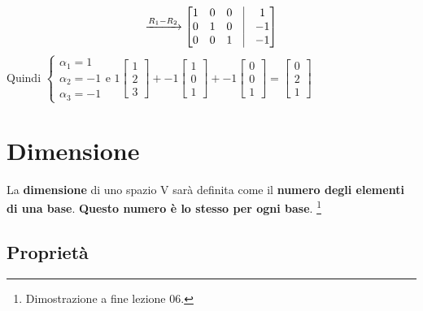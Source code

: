 \documentclass[a4paper, 12pt]{report}
\begin{document}
                $$
                \xrightarrow[]{R_1-R_2}
                \begin{bmatrix}
                    1 & 0 & 0 & \vline & 1\\
                    0 & 1 & 0 & \vline & -1\\
                    0 & 0 & 1 & \vline & -1
                \end{bmatrix}
                $$
                Quindi 
                $
                \begin{cases}
                    \alpha_1=1\\
                    \alpha_2=-1\\
                    \alpha_3=-1
                \end{cases}
                \text{e }
                1
                \begin{bmatrix}
                    1\\
                    2\\
                    3
                \end{bmatrix}
                +-1
                \begin{bmatrix}
                    1\\
                    0\\
                    1
                \end{bmatrix}
                +-1
                \begin{bmatrix}
                    0\\
                    0\\
                    1
                \end{bmatrix}
                =
                \begin{bmatrix}
                    0\\
                    2\\
                    1
                \end{bmatrix}
                $
        \section{Dimensione}
        La \textbf{dimensione} di uno spazio V sarà definita come il \textbf{numero degli elementi di una base}. \textbf{Questo numero è lo stesso per ogni base}. \footnote{Dimostrazione a fine lezione 06.}
            \subsection{Proprietà}
\end{document}
